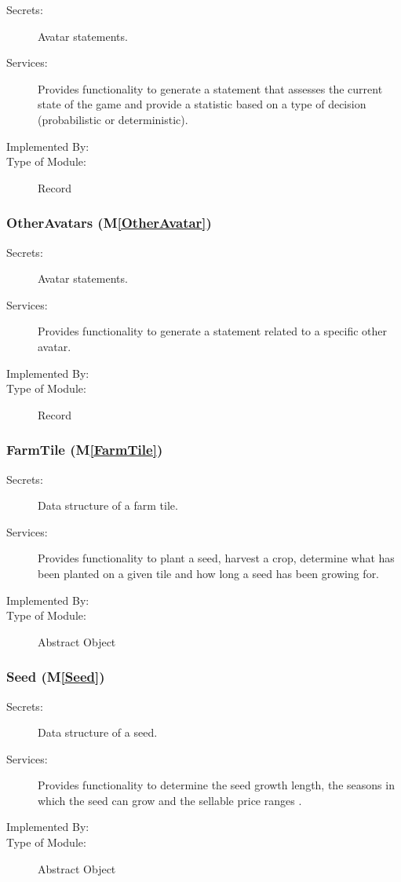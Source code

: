 \documentclass[12pt, titlepage]{article}
\newcommand{\mref}[1]{M\ref{#1}}
\begin{document}
\begin{description}
\item[Secrets:] Avatar statements.
\item[Services:] Provides functionality to generate a statement that assesses the current state of the game and provide a statistic based on a type of decision (probabilistic or deterministic).
\item[Implemented By:]  \progname
\item[Type of Module:] Record
\end{description}

\subsubsection{OtherAvatars (\mref{OtherAvatar})}

\begin{description}
\item[Secrets:] Avatar statements.
\item[Services:] Provides functionality to generate a statement related to a specific other avatar.
\item[Implemented By:]  \progname
\item[Type of Module:] Record
\end{description}




\subsubsection{FarmTile (\mref{FarmTile})}

\begin{description}
\item[Secrets:] Data structure of a farm tile.
\item[Services:] Provides functionality to plant a seed, harvest a crop, determine what has been planted on a given tile and how long a seed has been growing for.
\item[Implemented By:]  \progname
\item[Type of Module:] Abstract Object
\end{description}

\subsubsection{Seed (\mref{Seed})}

\begin{description}
\item[Secrets:] Data structure of a seed.
\item[Services:] Provides functionality to determine the seed growth length, the seasons in which the seed can grow and the sellable price ranges .
\item[Implemented By:]  \progname
\item[Type of Module:] Abstract Object
\end{description}
\end{document}
